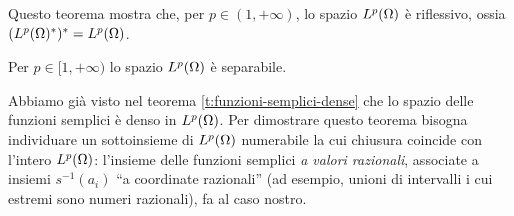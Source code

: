 Questo teorema mostra che, per $p\in(1,+\infty)$, lo spazio $\leb[p]{\Omega}$ è riflessivo, ossia $\dual{(\dual{\leb[p]{\Omega}})}=\leb[p]{\Omega}$.

\begin{teorema} \label{t:Lp-separabile}
    Per $p\in[1,+\infty)$ lo spazio $\leb[p]{\Omega}$ è separabile.
\end{teorema}
Abbiamo già visto nel teorema \ref{t:funzioni-semplici-dense} che lo spazio delle funzioni semplici è denso in $\leb[p]{\Omega}$.
Per dimostrare questo teorema bisogna individuare un sottoinsieme di $\leb[p]{\Omega}$ numerabile la cui chiusura coincide con l'intero $\leb[p]{\Omega}$: l'insieme delle funzioni semplici \emph{a valori razionali}, associate a insiemi $s^{-1}(a_i)$ ``a coordinate razionali'' (ad esempio, unioni di intervalli i cui estremi sono numeri razionali), fa al caso nostro.

